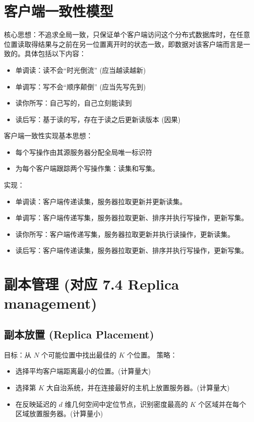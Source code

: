 \section{客户端一致性模型}

核心思想：不追求全局一致，只保证单个客户端访问这个分布式数据库时，在任意位置读取得结果与之前在另一位置离开时的状态一致，即数据对该客户端而言是一致的。具体包括以下内容：
\begin{itemize}
\item 单调读：读不会“时光倒流” (应当越读越新)
\item 单调写：写不会“顺序颠倒” (应当先写先到)
\item 读你所写：自己写的，自己立刻能读到
\item 读后写：基于读的写，存在于读之后更新读版本 (因果)
\end{itemize}

客户端一致性实现基本思想：
\begin{itemize}
\item 每个写操作由其源服务器分配全局唯一标识符
\item 为每个客户端跟踪两个写操作集：读集和写集。
\end{itemize}

实现：
\begin{itemize}
\item 单调读：客户端传递读集，服务器拉取更新并更新读集。
\item 单调写：客户端传递写集，服务器拉取更新、排序并执行写操作，更新写集。
\item 读你所写：客户端传递写集，服务器拉取更新并执行读操作，更新读集。
\item 读后写：客户端传递读集，服务器拉取更新、排序并执行写操作，更新写集。
\end{itemize}

\section{副本管理 (对应 7.4 Replica management)}

\subsection{副本放置 (Replica Placement)}

目标：从 $N$ 个可能位置中找出最佳的 $K$ 个位置。
策略：
\begin{itemize}
\item 选择平均客户端距离最小的位置。(计算量大)
\item 选择第 $K$ 大自治系统，并在连接最好的主机上放置服务器。(计算量大)
\item 在反映延迟的 $d$ 维几何空间中定位节点，识别密度最高的 $K$ 个区域并在每个区域放置服务器。(计算量小)
\end{itemize}

